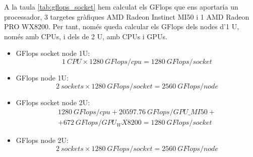 A la taula \ref{tab:gflops_socket} hem calculat els GFlops que ens aportaria un processador, 3 targetes gràfiques AMD Radeon Instinct MI50 i 1 AMD Radeon PRO WX8200. Per tant, només queda calcular els GFlops dels nodes d'1 U, només amb CPUs, i dels de 2 U, amb CPUs i GPUs.

\begin{itemize}
    \item GFlops socket node 1U:\\
        \[ 1\ CPU \times 1280\ GFlops/cpu = 1280\ GFlops/socket\]
    \item GFlops node 1U:\\
\[2\ sockets \times 1280\ GFlops/socket = 2560\ GFlops/node\]
    \item GFlops socket node 2U:\\
        \[ \begin{aligned} 1280\ GFlops/cpu + 20597.76\ GFlops/GPU\_MI50 + \\ + 672\ GFlops/GPU_WX8200 = 1280\ GFlops/socket \end{aligned} \]

    \item GFlops node 2U:\\
\[2\ sockets \times 1280\ GFlops/socket = 2560\ GFlops/node\]
\end{itemize}
